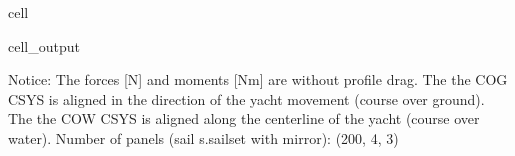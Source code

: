 \documentclass[letterpaper,10pt,english]{jupyterBook}
\begin{document}
\begin{sphinxuseclass}{cell}
\begin{sphinxVerbatimOutput}
\begin{sphinxuseclass}{cell_output}
\begin{sphinxVerbatim}[commandchars=\\\{\}]
\PYGZhy{}\PYGZhy{}\PYGZhy{}\PYGZhy{}\PYGZhy{}\PYGZhy{}\PYGZhy{}\PYGZhy{}\PYGZhy{}\PYGZhy{}\PYGZhy{}\PYGZhy{}\PYGZhy{}\PYGZhy{}\PYGZhy{}\PYGZhy{}\PYGZhy{}\PYGZhy{}\PYGZhy{}\PYGZhy{}\PYGZhy{}\PYGZhy{}\PYGZhy{}\PYGZhy{}\PYGZhy{}\PYGZhy{}\PYGZhy{}\PYGZhy{}\PYGZhy{}\PYGZhy{}\PYGZhy{}\PYGZhy{}\PYGZhy{}\PYGZhy{}\PYGZhy{}\PYGZhy{}\PYGZhy{}\PYGZhy{}\PYGZhy{}\PYGZhy{}\PYGZhy{}\PYGZhy{}\PYGZhy{}\PYGZhy{}\PYGZhy{}\PYGZhy{}\PYGZhy{}\PYGZhy{}\PYGZhy{}\PYGZhy{}\PYGZhy{}\PYGZhy{}\PYGZhy{}\PYGZhy{}\PYGZhy{}\PYGZhy{}\PYGZhy{}\PYGZhy{}\PYGZhy{}\PYGZhy{}\PYGZhy{}
Notice:
	The forces [N] and moments [Nm] are without profile drag.
	The the \PYGZus{}COG\PYGZus{} CSYS is aligned in the direction of the yacht movement (course over ground).
	The the \PYGZus{}COW\PYGZus{} CSYS is aligned along the centerline of the yacht (course over water).
	Number of panels (sail s.sail\PYGZus{}set with mirror): (200, 4, 3)
\end{sphinxVerbatim}


\end{sphinxuseclass}
\end{sphinxVerbatimOutput}
\end{sphinxuseclass}
\end{document}
